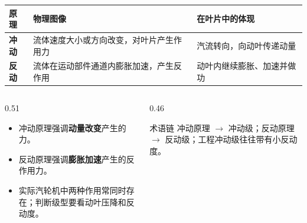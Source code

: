 \begin{frame}[t,shrink]{}
\begin{smalltab}
\begin{tabularx}{\linewidth}{@{}>{\bfseries}p{16mm}p{48mm}X@{}}
  \toprule
  原理 & 物理图像 & 在叶片中的体现\\
  \midrule
  冲动 & 流体速度大小或方向改变，对叶片产生作用力 & 汽流转向，向动叶传递动量\\
  反动 & 流体在运动部件通道内膨胀加速，产生反作用 & 动叶内继续膨胀、加速并做功\\
  \bottomrule
\end{tabularx}
\end{smalltab}
\begin{columns}[T,onlytextwidth]
\begin{column}{0.51\textwidth}
  \begin{itemize}
    \item 冲动原理强调\textbf{动量改变}产生的力。
    \item 反动原理强调\textbf{膨胀加速}产生的反作用力。
    \item 实际汽轮机中两种作用常同时存在；判断级型要看动叶压降和反动度。
  \end{itemize}
\end{column}
\begin{column}{0.46\textwidth}
  \begin{keybox}{术语链}
  \small 冲动原理 $\rightarrow$ 冲动级；反动原理 $\rightarrow$ 反动级；工程冲动级往往带有小反动度。
  \end{keybox}
\end{column}
\end{columns}
\end{frame}

